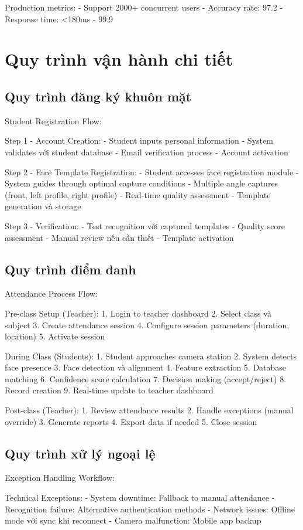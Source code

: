 \documentclass[12pt,a4paper]{report}
\begin{document}
Production metrics:
- Support 2000+ concurrent users
- Accuracy rate: 97.2%
- Response time: <180ms
- 99.9%

\section{Quy trình vận hành chi tiết}
\subsection{Quy trình đăng ký khuôn mặt}
Student Registration Flow:

Step 1 - Account Creation:
- Student inputs personal information
- System validates với student database
- Email verification process
- Account activation

Step 2 - Face Template Registration:
- Student accesses face registration module
- System guides through optimal capture conditions
- Multiple angle captures (front, left profile, right profile)
- Real-time quality assessment
- Template generation và storage

Step 3 - Verification:
- Test recognition với captured templates
- Quality score assessment
- Manual review nếu cần thiết
- Template activation

\subsection{Quy trình điểm danh}
Attendance Process Flow:

Pre-class Setup (Teacher):
1. Login to teacher dashboard
2. Select class và subject
3. Create attendance session
4. Configure session parameters (duration, location)
5. Activate session

During Class (Students):
1. Student approaches camera station
2. System detects face presence
3. Face detection và alignment
4. Feature extraction
5. Database matching
6. Confidence score calculation
7. Decision making (accept/reject)
8. Record creation
9. Real-time update to teacher dashboard

Post-class (Teacher):
1. Review attendance results
2. Handle exceptions (manual override)
3. Generate reports
4. Export data if needed
5. Close session

\subsection{Quy trình xử lý ngoại lệ}
Exception Handling Workflow:

Technical Exceptions:
- System downtime: Fallback to manual attendance
- Recognition failure: Alternative authentication methods
- Network issues: Offline mode với sync khi reconnect
- Camera malfunction: Mobile app backup
\end{document}
